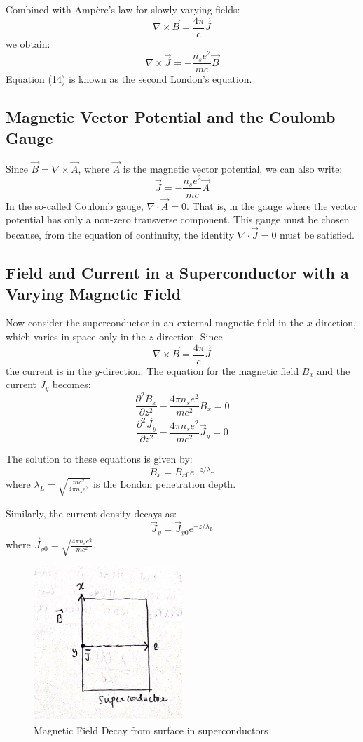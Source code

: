 \documentclass{article}
\begin{document}
Combined with Ampère's law for slowly varying fields:
\[
\nabla \times \vec{B} = \frac{4\pi}{c} \vec{J}
\]
we obtain:
\[
\nabla \times \vec{J} = -\frac{n_s e^2}{mc} \vec{B} \tag{14}
\]
Equation (14) is known as the second London's equation.

\subsection{Magnetic Vector Potential and the Coulomb Gauge}

Since \(\vec{B} = \nabla \times \vec{A}\), where \(\vec{A}\) is the magnetic vector potential, we can also write:
\[
\vec{J} = - \frac{n_s e^2}{mc} \vec{A} \tag{15}
\]
In the so-called Coulomb gauge, \(\nabla \cdot \vec{A} = 0\). That is, in the gauge where the vector potential has only a non-zero transverse component. This gauge must be chosen because, from the equation of continuity, the identity \(\nabla \cdot \vec{J} = 0\) must be satisfied.

\subsection{Field and Current in a Superconductor with a Varying Magnetic Field}

Now consider the superconductor in an external magnetic field in the \(x\)-direction, which varies in space only in the \(z\)-direction. Since
\[
\nabla \times \vec{B} = \frac{4\pi}{c} \vec{J}
\]
the current is in the \(y\)-direction. The equation for the magnetic field \(B_x\) and the current \(J_y\) becomes:
\[
\frac{\partial^2 B_x}{\partial z^2} - \frac{4\pi n_s e^2}{mc^2} B_x = 0
\]
\[
\frac{\partial^2 \vec{J}_y}{\partial z^2} - \frac{4\pi n_s e^2}{mc^2} \vec{J}_y = 0
\]

The solution to these equations is given by:
\[
B_x = B_{x0} e^{-z/\lambda_L} \tag{14}
\]
where \(\lambda_L = \sqrt{\frac{mc^2}{4\pi n_s e^2}}\) is the London penetration depth.

Similarly, the current density decays as:
\[
\vec{J}_y = \vec{J}_{y0} e^{-z/\lambda_L}
\]
where \(\vec{J}_{y0} = \sqrt{\frac{4\pi n_s e^2}{mc^2}} \).

\begin{figure}
    \begin{center}
        \includegraphics[width=0.5\textwidth]{figures/5.png}
    \end{center}
    \caption{Magnetic Field Decay from surface in superconductors}\label{fig:}
\end{figure}
\end{document}
